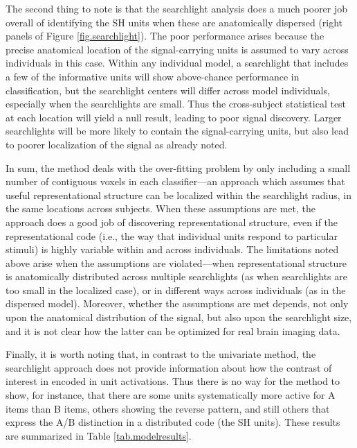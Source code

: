 The second thing to note is that the searchlight analysis does a much poorer job overall of identifying the SH units when these are anatomically dispersed (right panels of Figure \ref{fig.searchlight}). The poor performance arises because the precise anatomical location of the signal-carrying units is assumed to vary across individuals in this case. Within any individual model, a searchlight that includes a few of the informative units will show above-chance performance in classification, but the searchlight centers will differ across model individuals, especially when the searchlights are small. Thus the cross-subject statistical test at each location will yield a null result, leading to poor signal discovery. Larger searchlights will be more likely to contain the signal-carrying units, but also lead to poorer localization of the signal as already noted. 

In sum, the method deals with the over-fitting problem by only including a small number of contiguous voxels in each classifier---an approach which assumes that useful representational structure can be localized within the searchlight radius, in the same locations across subjects. When these assumptions are met, the approach does a good job of discovering representational structure, even if the representational code (i.e., the way that individual units respond to particular stimuli) is highly variable within and across individuals. The limitations noted above arise when the assumptions are violated---when representational structure is anatomically distributed across multiple searchlights (as when searchlights are too small in the localized case), or in different ways across individuals (as in the dispersed model). Moreover, whether the assumptions are met depends, not only upon the anatomical distribution of the signal, but also upon the searchlight size, and it is not clear how the latter can be optimized for real brain imaging data.  

Finally, it is worth noting that, in contrast to the univariate method, the searchlight approach does not provide information about how the contrast of interest in encoded in unit activations. Thus there is no way for the method to show, for instance, that there are some units systematically more active for A items than B items, others showing the reverse pattern, and still others that express the A/B distinction in a distributed code (the SH units). These results are summarized in Table \ref{tab.modelresults}.